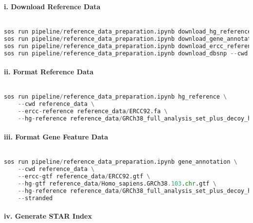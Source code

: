 \documentclass[12pt]{article}
\begin{document}
\paragraph*{i. Download Reference Data}


\noindent
\begin{lstlisting}[language=Python]

sos run pipeline/reference_data_preparation.ipynb download_hg_reference --cwd reference_data
sos run pipeline/reference_data_preparation.ipynb download_gene_annotation --cwd reference_data
sos run pipeline/reference_data_preparation.ipynb download_ercc_reference --cwd reference_data
sos run pipeline/reference_data_preparation.ipynb download_dbsnp --cwd reference_data

\end{lstlisting}




\paragraph*{ii. Format Reference Data}


\noindent
\begin{lstlisting}[language=Python]

sos run pipeline/reference_data_preparation.ipynb hg_reference \
    --cwd reference_data \
    --ercc-reference reference_data/ERCC92.fa \
    --hg-reference reference_data/GRCh38_full_analysis_set_plus_decoy_hla.fa

\end{lstlisting}




\paragraph*{iii. Format Gene Feature Data}


\noindent
\begin{lstlisting}[language=Python]

sos run pipeline/reference_data_preparation.ipynb gene_annotation \
    --cwd reference_data \
    --ercc-gtf reference_data/ERCC92.gtf \
    --hg-gtf reference_data/Homo_sapiens.GRCh38.103.chr.gtf \
    --hg-reference reference_data/GRCh38_full_analysis_set_plus_decoy_hla.noALT_noHLA_noDecoy.fasta \
    --stranded

\end{lstlisting}




\paragraph*{iv. Generate STAR Index}
\end{document}

